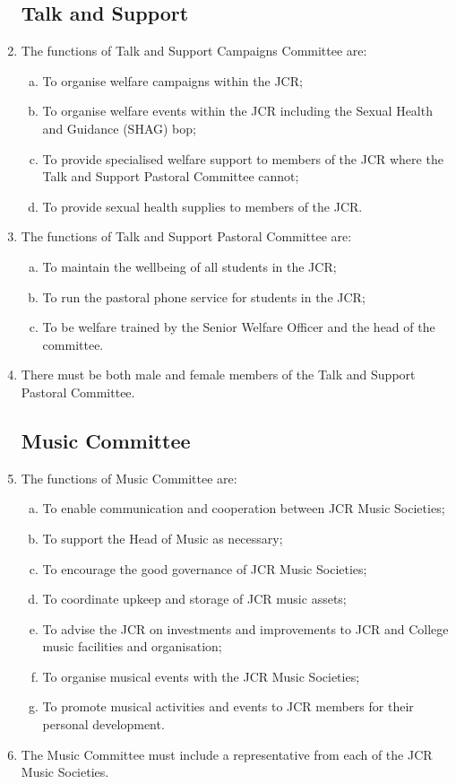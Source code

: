 \documentclass[12pt]{article}
\begin{document}
\begin{enumerate}
    \subsection{Talk and Support}
    \item The functions of Talk and Support Campaigns Committee are:
    \begin{enumerate}[(a)]
        \item To organise welfare campaigns within the JCR;
        \item To organise welfare events within the JCR including the Sexual Health and Guidance (SHAG) bop;
        \item To provide specialised welfare support to members of the JCR where the Talk and Support Pastoral Committee cannot;
        \item To provide sexual health supplies to members of the JCR.
    \end{enumerate}
    \item The functions of Talk and Support Pastoral Committee are:
    \begin{enumerate}[(a)]
        \item To maintain the wellbeing of all students in the JCR;
        \item To run the pastoral phone service for students in the JCR;
        \item To be welfare trained by the Senior Welfare Officer and the head of the committee.
    \end{enumerate}
    \item There must be both male and female members of the Talk and Support Pastoral Committee.

    \subsection{Music Committee}
    \item The functions of Music Committee are:
    \begin{enumerate}[(a)]
        \item To enable communication and cooperation between JCR Music Societies;
        \item To support the Head of Music as necessary;
        \item To encourage the good governance of JCR Music Societies;
        \item To coordinate upkeep and storage of JCR music assets;
        \item To advise the JCR on investments and improvements to JCR and College music facilities and organisation;
        \item To organise musical events with the JCR Music Societies;
        \item To promote musical activities and events to JCR members for their personal development.
    \end{enumerate}
    \item The Music Committee must include a representative from each of the JCR Music Societies.


\end{enumerate}
\end{document}
